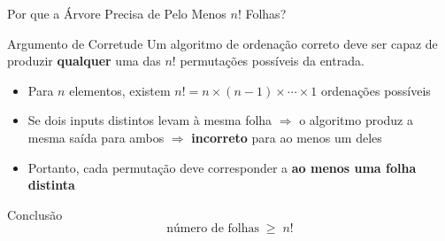 \documentclass[aspectratio=169]{beamer}
\begin{document}
\begin{frame}[shrink=5]{Por que a Árvore Precisa de Pelo Menos $n!$ Folhas?}
  \begin{alertblock}{Argumento de Corretude}
    Um algoritmo de ordenação correto deve ser capaz de produzir \textbf{qualquer} uma das
    $n!$ permutações possíveis da entrada.
  \end{alertblock}

  \medskip
  \begin{itemize}
    \item Para $n$ elementos, existem $n! = n \times (n{-}1) \times \cdots \times 1$ ordenações possíveis
    \item Se dois inputs distintos levam à mesma folha $\Rightarrow$ o algoritmo produz a mesma saída para ambos $\Rightarrow$ \textbf{incorreto} para ao menos um deles
    \item Portanto, cada permutação deve corresponder a \textbf{ao menos uma folha distinta}
  \end{itemize}

  \medskip
  \begin{block}{Conclusão}
    \[
      \text{número de folhas} \;\geq\; n!
    \]
  \end{block}
\end{frame}
\end{document}
